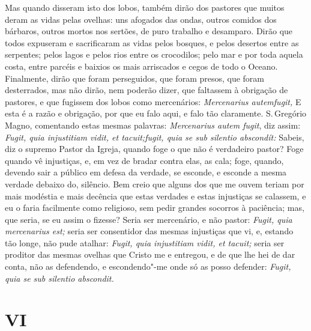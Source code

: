 Mas quando disseram isto dos lobos, também dirão dos pastores que muitos
deram as vidas pelas ovelhas: uns afogados das ondas, outros comidos dos
bárbaros, outros mortos nos sertões, de puro trabalho e desamparo. Dirão
que todos expuseram e sacrificaram as vidas pelos bosques, e pelos
desertos entre as serpentes; pelos lagos e pelos rios entre os
crocodilos; pelo mar e por toda aquela costa, entre parcéis e baixios os
mais arriscados e cegos de todo o Oceano. Finalmente, dirão que foram
perseguidos, que foram presos, que foram desterrados, mas não dirão, nem
poderão dizer, que faltassem à obrigação de pastores, e que fugissem dos
lobos como mercenários: \emph{Mercenarius autemfugit,} E esta é a razão
e obrigação, por que eu falo aqui, e falo tão claramente. S.\,Gregório
Magno, comentando estas mesmas palavras: \emph{Mercenarius autem fugit}, diz assim: \emph{Fugit, quia injustitiam vidit, et tacuit;fugit,
quia se sub silentio abscondít:} Sabeis, diz o supremo Pastor da
Igreja, quando foge o que não é verdadeiro pastor? Foge quando vê
injustiças, e, em vez de bradar contra elas, as cala; foge, quando,
devendo sair a público em defesa da verdade, se esconde, e esconde a
mesma verdade debaixo do, silêncio. Bem creio que alguns dos que me
ouvem teriam por mais modéstia e mais decência que estas verdades e
estas injustiças se calassem, e eu o faria facilmente como religioso,
sem pedir grandes socorros à paciência; mas, que seria, se eu assim o
fizesse? Seria ser mercenário, e não pastor: \emph{Fugit, quia
mercenarius est;} seria ser consentidor das mesmas injustiças que vi, e,
estando tão longe, não pude atalhar: \emph{Fugit, quia injustitiam
vidit, et tacuit;} seria ser proditor das mesmas ovelhas que Cristo me e
entregou, e de que lhe hei de dar conta, não as defendendo, e
escondendo"-me onde só as posso defender: \emph{Fugit, quia se sub
silentio abscondit.}

\section{VI}


